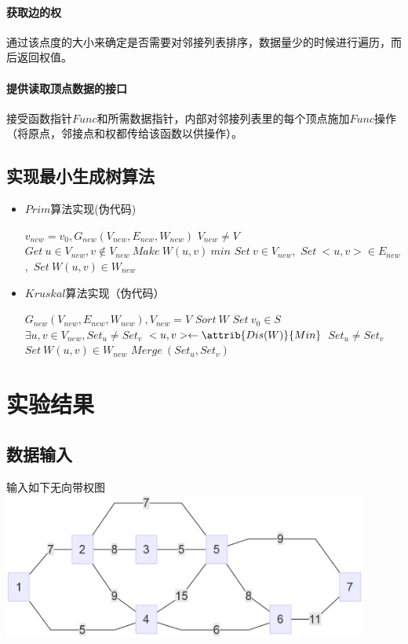 \documentclass[a4paper,10pt]{ctexart}
\begin{document}
\paragraph{获取边的权}通过该点度的大小来确定是否需要对邻接列表排序，数据量少的时候进行遍历，而后返回权值。
\paragraph{提供读取顶点数据的接口}接受函数指针$Func$和所需数据指针，内部对邻接列表里的每个顶点施加$Func$操作（将原点，邻接点和权都传给该函数以供操作）。

\subsection{实现最小生成树算法}
\begin{itemize}
\item $Prim$算法实现(伪代码)
\begin{codebox}
\li $v_{new} = v_0,G_{new}(V_{new},E_{new},W_{new})$
\li \While $V_{new} \ne V$
    \Do
\li     $Get\ u\in V_{new},v\not\in V_{new}\ Make\ W(u,v)\ min$
\li     $Set\ v \in V_{new}$,\ $Set\ <u,v>\in E_{new}$,\ $Set\ W(u,v)\in W_{new}$
    \End
\end{codebox}
\item $Kruskal$算法实现（伪代码）
\begin{codebox}
\li $G_{new}(V_{new},E_{new},W_{new}),V_{new}=V$
\li $Sort\ W$
\li $Set \  v_0 \in S$
\li \While $\exists u,v \in V_{new},Set_u \not= Set_v$
    \Do
\li     $<u,v> \gets \attrib{Dis(W)}{Min}$
\li     \If $Set_u \not= Set_v$
        \Do
\li        $Set \ W(u,v) \in W_{new}$
\li        $Merge\ (Set_u,Set_v)$
        \End
    \End
\end{codebox}
\end{itemize}

\section{实验结果}
\subsection{数据输入}
输入如下无向带权图\\
\includegraphics[width=0.9\textwidth]{../Pics/Test-MiniTree.eps}
\end{document}
